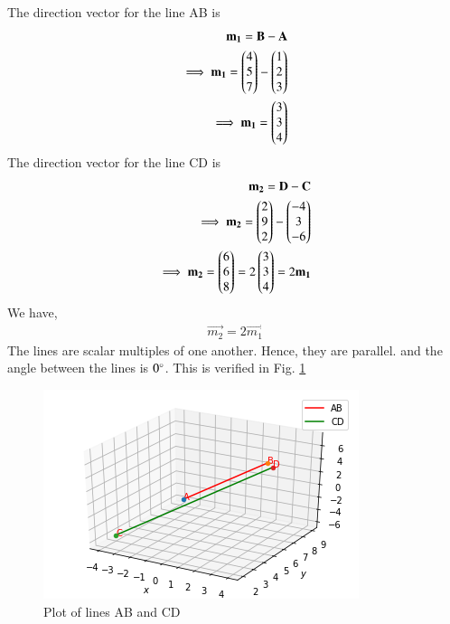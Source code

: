 The direction vector for the line AB is
\begin{align}
    \mathbf{m_1} = \mathbf{B} - \mathbf{A}\\
    \implies \mathbf{m_1} = \begin{pmatrix}4\\5\\7\end{pmatrix} - \begin{pmatrix}1\\2\\3\end{pmatrix}\\
    \implies \mathbf{m_1} = \begin{pmatrix}3\\3\\4\end{pmatrix}
\end{align}
The direction vector for the line CD is
\begin{align}
    \mathbf{m_2} = \mathbf{D} - \mathbf{C}\\
    \implies \mathbf{m_2} = \begin{pmatrix}2\\9\\2\end{pmatrix} - \begin{pmatrix}-4\\3\\-6\end{pmatrix}\\
    \implies \mathbf{m_2} = \begin{pmatrix}6\\6\\8\end{pmatrix} = 2\begin{pmatrix}3\\3\\4\end{pmatrix} = 2\mathbf{m_1}
\end{align}
We have,
\begin{align}
    \vec{m_2} = 2 \vec{m_1}
\end{align}
The lines are scalar multiples of one another. Hence, they are parallel. and the angle between the lines is $ 0\degree$.  This is verified in Fig. \ref{aug/2/ex/32fig:lines}
\begin{figure}[h!]
\centering
\includegraphics[width=\columnwidth]{solutions/aug/2/32/figures/lines.png}
\caption{Plot of lines AB and CD}
\label{aug/2/ex/32fig:lines}
\end{figure}

